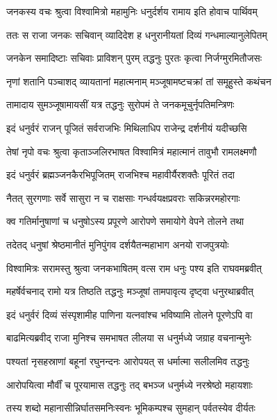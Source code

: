 
\twolineshloka
{जनकस्य वचः श्रुत्वा विश्वामित्रो महामुनिः}
{धनुर्दर्शय रामाय इति होवाच पार्थिवम्} %

\twolineshloka
{ततः स राजा जनकः सचिवान् व्यादिदेश ह}
{धनुरानीयतां दिव्यं गन्धमाल्यानुलेपितम्} %

\twolineshloka
{जनकेन समादिष्टाः सचिवाः प्राविशन् पुरम्}
{तद्धनुः पुरतः कृत्वा निर्जग्मुरमितौजसः} %

\twolineshloka
{नृणां शतानि पञ्चाशद् व्यायतानां महात्मनाम्}
{मञ्जूषामष्टचक्रां तां समूहुस्ते कथंचन} %

\twolineshloka
{तामादाय सुमञ्जूषामायसीं यत्र तद्धनुः}
{सुरोपमं ते जनकमूचुर्नृपतिमन्त्रिणः} %

\twolineshloka
{इदं धनुर्वरं राजन् पूजितं सर्वराजभिः}
{मिथिलाधिप राजेन्द्र दर्शनीयं यदीच्छसि} %

\twolineshloka
{तेषां नृपो वचः श्रुत्वा कृताञ्जलिरभाषत}
{विश्वामित्रं महात्मानं तावुभौ रामलक्ष्मणौ} %

\twolineshloka
{इदं धनुर्वरं ब्रह्मञ्जनकैरभिपूजितम्}
{राजभिश्च महावीर्यैरशक्तैः पूरितं तदा} %

\twolineshloka
{नैतत् सुरगणाः सर्वे सासुरा न च राक्षसाः}
{गन्धर्वयक्षप्रवराः सकिन्नरमहोरगाः} %

\twolineshloka
{क्व गतिर्मानुषाणां च धनुषोऽस्य प्रपूरणे}
{आरोपणे समायोगे वेपने तोलने तथा} %

\twolineshloka
{तदेतद् धनुषां श्रेष्ठमानीतं मुनिपुंगव}
{दर्शयैतन्महाभाग अनयो राजपुत्रयोः} %

\twolineshloka
{विश्वामित्रः सरामस्तु श्रुत्वा जनकभाषितम्}
{वत्स राम धनुः पश्य इति राघवमब्रवीत्} %

\twolineshloka
{महर्षेर्वचनाद् रामो यत्र तिष्ठति तद्धनुः}
{मञ्जूषां तामपावृत्य दृष्ट्वा धनुरथाब्रवीत्} %

\twolineshloka
{इदं धनुर्वरं दिव्यं संस्पृशामीह पाणिना}
{यत्नवांश्च भविष्यामि तोलने पूरणेऽपि वा} %

\twolineshloka
{बाढमित्यब्रवीद् राजा मुनिश्च समभाषत}
{लीलया स धनुर्मध्ये जग्राह वचनान्मुनेः} %

\twolineshloka
{पश्यतां नृसहस्राणां बहूनां रघुनन्दनः}
{आरोपयत् स धर्मात्मा सलीलमिव तद्धनुः} %

\twolineshloka
{आरोपयित्वा मौर्वीं च पूरयामास तद्धनुः}
{तद् बभञ्ज धनुर्मध्ये नरश्रेष्ठो महायशाः} %

\twolineshloka
{तस्य शब्दो महानासीन्निर्घातसमनिःस्वनः}
{भूमिकम्पश्च सुमहान् पर्वतस्येव दीर्यतः} %


